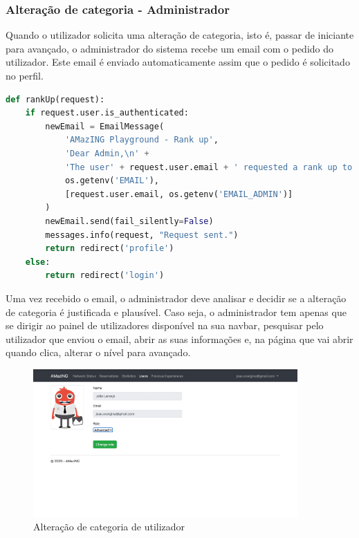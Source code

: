 \subsubsection{Alteração de categoria - Administrador}
Quando o utilizador solicita uma alteração de categoria, isto é, passar de iniciante para avançado, o administrador do sistema recebe um email com o pedido do utilizador.\newline
Este email é enviado automaticamente assim que o pedido é solicitado no perfil.
\begin{lstlisting}[language=python,caption={Solicitação de alteração de categoria},breaklines=true,label={code:createap}]
def rankUp(request):
    if request.user.is_authenticated:
        newEmail = EmailMessage(
            'AMazING Playground - Rank up',
            'Dear Admin,\n' +
            'The user' + request.user.email + ' requested a rank up to his account.',
            os.getenv('EMAIL'),
            [request.user.email, os.getenv('EMAIL_ADMIN')]
        )
        newEmail.send(fail_silently=False)
        messages.info(request, "Request sent.")
        return redirect('profile')
    else:
        return redirect('login')
\end{lstlisting}
Uma vez recebido o email, o administrador deve analisar e decidir se a alteração de categoria é justificada e plausível. Caso seja, o administrador tem apenas que se dirigir ao painel de utilizadores disponível na sua navbar, pesquisar pelo utilizador que enviou o email, abrir as suas informações e, na página que vai abrir quando clica, alterar o nível para avançado.
\begin{figure}[!ht]
    \centering
    \includegraphics[width=0.9\textwidth]{images/change_user_role.png}
    \caption{Alteração de categoria de utilizador}
    \label{fig:seeprofile}
\end{figure}

